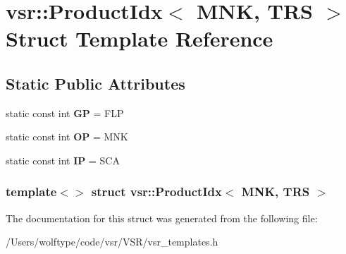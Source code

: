 \hypertarget{structvsr_1_1_product_idx_3_01_m_n_k_00_01_t_r_s_01_4}{\section{vsr\-:\-:Product\-Idx$<$ M\-N\-K, T\-R\-S $>$ Struct Template Reference}
\label{structvsr_1_1_product_idx_3_01_m_n_k_00_01_t_r_s_01_4}
}
\subsection*{Static Public Attributes}
\begin{DoxyCompactItemize}
\item 
\hypertarget{structvsr_1_1_product_idx_3_01_m_n_k_00_01_t_r_s_01_4_a8acf163582b6ac6b2cfcc2821e4764b5}{static const int {\bfseries G\-P} = F\-L\-P}\label{structvsr_1_1_product_idx_3_01_m_n_k_00_01_t_r_s_01_4_a8acf163582b6ac6b2cfcc2821e4764b5}

\item 
\hypertarget{structvsr_1_1_product_idx_3_01_m_n_k_00_01_t_r_s_01_4_ad413efc01862d02703a1044e80cb84c8}{static const int {\bfseries O\-P} = M\-N\-K}\label{structvsr_1_1_product_idx_3_01_m_n_k_00_01_t_r_s_01_4_ad413efc01862d02703a1044e80cb84c8}

\item 
\hypertarget{structvsr_1_1_product_idx_3_01_m_n_k_00_01_t_r_s_01_4_a7ef46eea22f5b8282b5fe8947eaacfc1}{static const int {\bfseries I\-P} = S\-C\-A}\label{structvsr_1_1_product_idx_3_01_m_n_k_00_01_t_r_s_01_4_a7ef46eea22f5b8282b5fe8947eaacfc1}

\end{DoxyCompactItemize}
\subsubsection*{template$<$$>$ struct vsr\-::\-Product\-Idx$<$ M\-N\-K, T\-R\-S $>$}



The documentation for this struct was generated from the following file\-:\begin{DoxyCompactItemize}
\item 
/\-Users/wolftype/code/vsr/\-V\-S\-R/vsr\-\_\-templates.\-h\end{DoxyCompactItemize}
